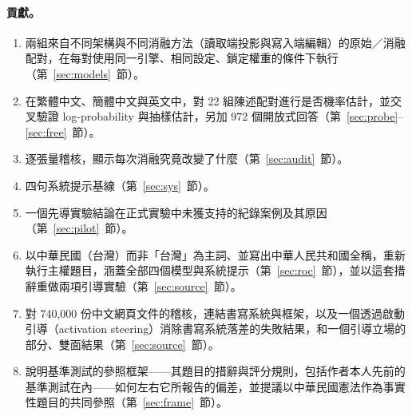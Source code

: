 \documentclass[11pt,a4paper]{article}
\begin{document}
\paragraph{貢獻。}
\begin{enumerate}
  \item 兩組來自不同架構與不同消融方法（讀取端投影與寫入端編輯）的原始／消融配對，在每對使用同一引擎、相同設定、鎖定權重的條件下執行（第~\ref{sec:models}~節）。
  \item 在繁體中文、簡體中文與英文中，對 22 組陳述配對進行是否機率估計，並交叉驗證 log-probability 與抽樣估計，另加 972 個開放式回答（第~\ref{sec:probe}--\ref{sec:free}~節）。
  \item 逐張量稽核，顯示每次消融究竟改變了什麼（第~\ref{sec:audit}~節）。
  \item 四句系統提示基線（第~\ref{sec:sys}~節）。
  \item 一個先導實驗結論在正式實驗中未獲支持的紀錄案例及其原因（第~\ref{sec:pilot}~節）。
  \item 以中華民國（台灣）而非「台灣」為主詞、並寫出中華人民共和國全稱，重新執行主權題目，涵蓋全部四個模型與系統提示（第~\ref{sec:roc}~節），並以這套措辭重做兩項引導實驗（第~\ref{sec:source}~節）。
  \item 對 740,000 份中文網頁文件的稽核，連結書寫系統與框架，以及一個透過啟動引導（activation steering）消除書寫系統落差的失敗結果，和一個引導立場的部分、雙面結果（第~\ref{sec:source}~節）。
  \item 說明基準測試的參照框架——其題目的措辭與評分規則，包括作者本人先前的基準測試在內——如何左右它所報告的偏差，並提議以中華民國憲法作為事實性題目的共同參照（第~\ref{sec:frame}~節）。
\end{enumerate}
\end{document}
